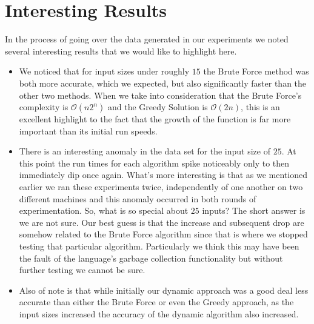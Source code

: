 \documentclass{article}
\begin{document}
\section{Interesting Results}
In the process of going over the data generated in our experiments we noted several interesting results that we would like to highlight here.
\begin{itemize}
    \item We noticed that for input sizes under roughly $15$ the Brute Force method was both more accurate, which we expected, but also significantly faster than the other two methods. When we take into consideration that the Brute Force's complexity is $\mathcal{O}(n2^n)$ and the Greedy Solution is $\mathcal{O}(2n)$, this is an excellent highlight to the fact that the growth of the function is far more important than its initial run speeds.
    \item There is an interesting anomaly in the data set for the input size of $25$. At this point the run times for each algorithm spike noticeably only to then immediately dip once again. What's more interesting is that as we mentioned earlier we ran these experiments twice, independently of one another on two different machines and this anomaly occurred in both rounds of experimentation.  So, what is so special about $25$ inputs? The short answer is we are not sure.  Our best guess is that the increase and subsequent drop are somehow related to the Brute Force algorithm since that is where we stopped testing that particular algorithm. Particularly we think this may have been the fault of the language's garbage collection functionality but without further testing we cannot be sure.
    \item Also of note is that while initially our dynamic approach was a good deal less accurate than either the Brute Force or even the Greedy approach, as the input sizes increased the accuracy of the dynamic algorithm also increased.
\end{itemize}
\end{document}
